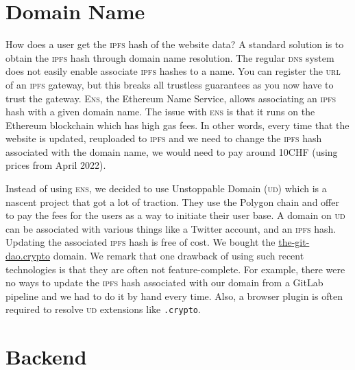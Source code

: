 \section{Domain Name}
\label{sec:demo_domain_name}

How does a user get the \textsc{ipfs} hash of the website data?
A standard solution is to obtain the \textsc{ipfs} hash through domain name resolution.
The regular \textsc{dns} system does not easily enable associate \textsc{ipfs} hashes to a name.
You can register the \textsc{url} of an \textsc{ipfs} gateway, but this breaks all trustless guarantees as you now have to trust the gateway.
\textsc{Ens}, the Ethereum Name Service, allows associating an \textsc{ipfs} hash with a given domain name.
The issue with \textsc{ens} is that it runs on the Ethereum blockchain which has high gas fees.
In other words, every time that the website is updated, reuploaded to \textsc{ipfs} and we need to change the \textsc{ipfs} hash associated with the domain name, we would need to pay around 10CHF (using prices from April 2022).

%
Instead of using \textsc{ens}, we decided to use Unstoppable Domain (\textsc{ud}) which is a nascent project that got a lot of traction.
They use the Polygon chain and offer to pay the fees for the users as a way to initiate their user base.
A domain on \textsc{ud} can be associated with various things like a Twitter account, and an \textsc{ipfs} hash.
Updating the associated \textsc{ipfs} hash is free of cost.
We bought the \href{https://the-git-dao.crypto/}{the-git-dao.crypto} domain.
We remark that one drawback of using such recent technologies is that they are often not feature-complete.
For example, there were no ways to update the \textsc{ipfs} hash associated with our domain from a GitLab pipeline and we had to do it by hand every time.
Also, a browser plugin is often required to resolve \textsc{ud} extensions like \texttt{.crypto}.

\section{Backend}
\label{sec:demo_backend}

